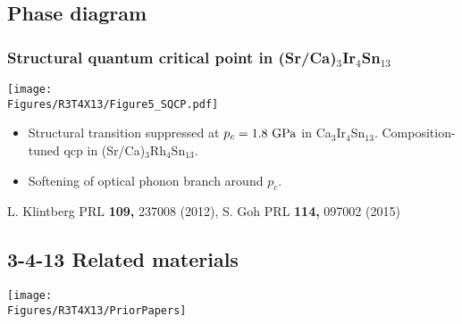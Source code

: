 \subsection{Phase diagram}
\begin{frame}[label=CIS-3]
\frametitle{Structural quantum critical point in (Sr/Ca)$_3$Ir$_4$Sn$_{13}$}
\centerline{\texttt{[image: \\Figures/R3T4X13/Figure5\_SQCP.pdf]}}

\begin{itemize}
\item
Structural transition suppressed at $p_c = 1.8 ~{\rm GPa}$ in 
Ca$_3$Ir$_4$Sn$_{13}$. Composition-tuned qcp in (Sr/Ca)$_3$Rh$_4$Sn$_{13}$.

\item
Softening of optical phonon branch around $p_c$.
\end{itemize}

\vspace*{\fill}
\centerline{\makebox[\linewidth]{\rule{0.85\textwidth}{0.4pt}}}
\centerline{\scriptsize L. Klintberg PRL {\bf 109,} 237008 (2012), S. Goh  PRL {\bf 114,}  097002 (2015)}
\end{frame}


%
\subsection{3-4-13 Related materials}
\begin{frame}[label=CIS-1]
\centerline{\texttt{[image: \\Figures/R3T4X13/PriorPapers]}}
\end{frame}


